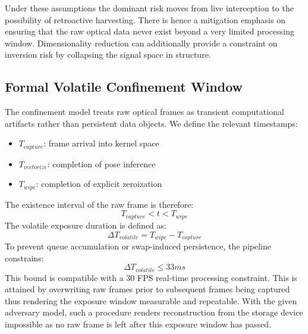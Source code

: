 \documentclass[conference]{IEEEtran}
\begin{document}
Under these assumptions the dominant risk moves from live interception to the possibility of retroactive harvesting. There is hence a mitigation emphasis on ensuring that the raw optical data never exist beyond a very limited processing window. Dimensionality reduction can additionally provide a constraint on inversion risk by collapsing the signal space in structure.


\subsection{Formal Volatile Confinement Window}
The confinement model treats raw optical frames as transient computational artifacts rather than persistent data objects. We define the relevant timestamps:
\begin{itemize}
    \item $T_{capture}$: frame arrival into kernel space
    \item $T_{vectorize}$: completion of pose inference
    \item $T_{wipe}$: completion of explicit zeroization
\end{itemize}

The existence interval of the raw frame is therefore:
\begin{equation}
T_{capture} < t < T_{wipe}
\end{equation}
The volatile exposure duration is defined as:
\begin{equation}
\Delta T_{volatile} = T_{wipe} - T_{capture}
\end{equation}
To prevent queue accumulation or swap-induced persistence, the pipeline constrains:
\begin{equation}
\Delta T_{volatile} \le 33ms
\end{equation}
This bound is compatible with a 30 FPS real-time processing constraint. This is attained by overwriting raw frames prior to subsequent frames being captured thus rendering the exposure window measurable and repeatable. With the given adversary model, such a procedure renders reconstruction from the storage device impossible as no raw frame is left after this exposure window has passed.

\end{document}
